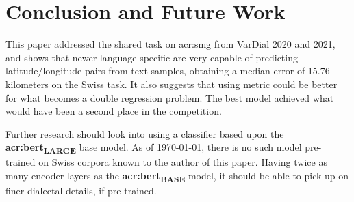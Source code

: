 \section{Conclusion and Future Work}
\label{sec:Conclusion}

\begin{comment}
What are the main contributions? How significant are they?
Discuss the contributions in terms of the initial goal formulated in the Introduction.

Also consider how you think the work could be extended or improved, or what you could have done differently.
\end{comment}

This paper addressed the shared task on \acrlong{acr:smg} from VarDial 2020 and 2021, and shows that newer language-specific  are very capable of predicting latitude/longitude pairs from text samples, obtaining a median error of 15.76 kilometers on the Swiss task. It also suggests that using metric  could be better for what becomes a double regression problem. The best model achieved what would have been a second place in the \citeyear{gamanReportVarDialEvaluation2020} competition.

Further research should look into using a classifier based upon the \textbf{\acrshort{acr:bert}\textsubscript{LARGE}} base model. As of \today, there is no such model pre-trained on Swiss corpora known to the author of this paper. Having twice as many encoder layers as the \textbf{\acrshort{acr:bert}\textsubscript{BASE}} model, it should be able to pick up on finer dialectal details, if pre-trained.
